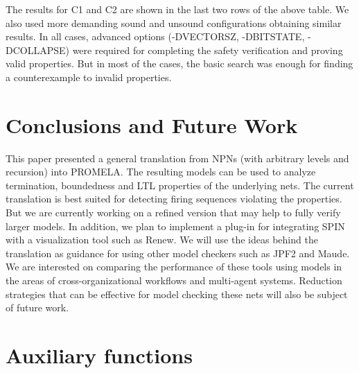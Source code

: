 \documentclass{llncs}
\begin{document}
The results for C1 and C2 are shown in the last two rows of the above table.  We also used more demanding sound and unsound configurations obtaining similar results. In all cases, advanced options (-DVECTORSZ, -DBITSTATE, -DCOLLAPSE) were required for completing the safety verification and proving valid properties. But in most of the cases, the basic search was enough for finding a counterexample to invalid properties.


\section{Conclusions and Future Work}
\label{sec:conclusion}


This paper presented a general translation from NPNs (with arbitrary levels and recursion) into PROMELA. The resulting models can be used to analyze termination, boundedness and LTL properties of the underlying nets. The current translation is best suited for detecting firing sequences violating the properties. But we are currently working on a refined version that may help to fully verify larger models. In addition, we plan to implement a plug-in for integrating SPIN with a visualization tool such as Renew. We will use the ideas behind the translation as guidance for using other model checkers such as JPF2 and Maude. We are interested on comparing the performance of these tools using models in the areas of cross-organizational workflows and multi-agent systems.  Reduction strategies that can be effective for model checking these nets will also be subject of future work.







\newpage

\appendix


\section{Auxiliary functions}
\label{app:aux.code}
\end{document}

